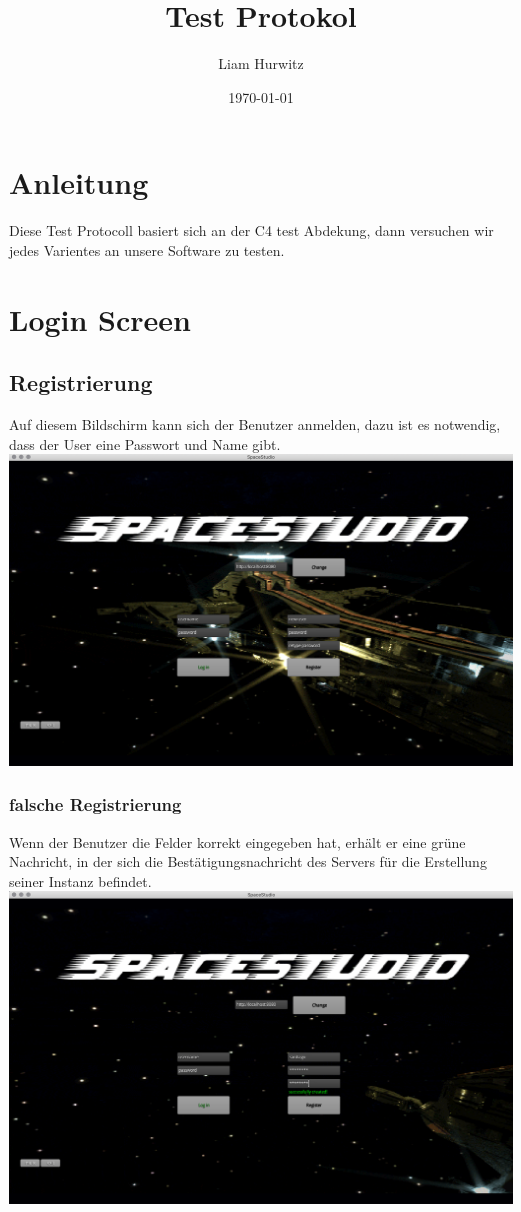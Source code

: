 \documentclass[11pt]{article}
\author{Liam Hurwitz}
\date{\today}
\title{Test Protokol}
\begin{document}
\maketitle
\newpage
\tableofcontents

\newpage
\section{Anleitung}
Diese Test Protocoll basiert sich an der C4 test Abdekung, dann versuchen wir jedes Varientes an unsere Software zu testen.

\section{Login Screen}

\label{sec:orgc5dc561}
\subsection{Registrierung}
Auf diesem Bildschirm kann sich der Benutzer anmelden, dazu ist es notwendig, dass der User eine Passwort und Name gibt.\\
\includegraphics[scale=0.2]{TestProtocolBilder/startScreen.png}
\newpage
\subsubsection{falsche  Registrierung}
Wenn der Benutzer die Felder korrekt eingegeben hat, erhält er eine grüne Nachricht, in der sich die Bestätigungsnachricht des Servers für die Erstellung seiner Instanz befindet.\\
\includegraphics[scale=0.2]{TestProtocolBilder/erfolgAnmelden.png}
\end{document}
